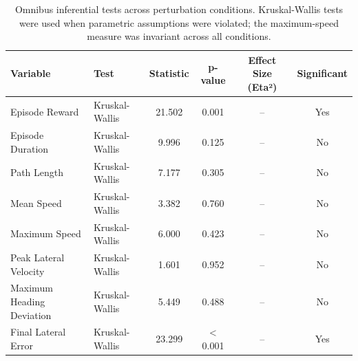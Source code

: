 \begin{table}[t]
\centering
\caption{Omnibus inferential tests across perturbation conditions. Kruskal-Wallis tests were used when parametric assumptions were violated; the maximum-speed measure was invariant across all conditions.}
\label{tab:omnibus_tests}
\begin{tabular}{l l c c c c}
\hline
Variable & Test & Statistic & p-value & Effect Size (Eta²) & Significant \\
\hline
Episode Reward & Kruskal-Wallis & 21.502 & 0.001 & -- & Yes \\
Episode Duration & Kruskal-Wallis & 9.996 & 0.125 & -- & No \\
Path Length & Kruskal-Wallis & 7.177 & 0.305 & -- & No \\
Mean Speed & Kruskal-Wallis & 3.382 & 0.760 & -- & No \\
Maximum Speed & Kruskal-Wallis & 6.000 & 0.423 & -- & No \\
Peak Lateral Velocity & Kruskal-Wallis & 1.601 & 0.952 & -- & No \\
Maximum Heading Deviation & Kruskal-Wallis & 5.449 & 0.488 & -- & No \\
Final Lateral Error & Kruskal-Wallis & 23.299 & < 0.001 & -- & Yes \\
\hline
\end{tabular}
\end{table}
